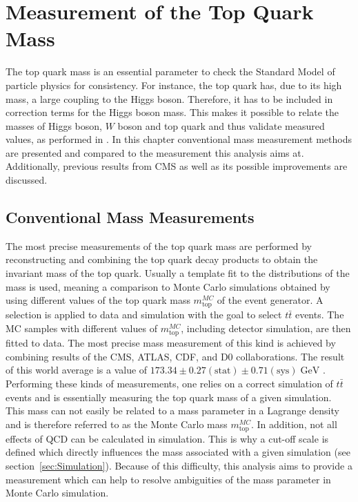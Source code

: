 \chapter{Measurement of the Top Quark Mass}
\label{ch:Measure}
	The top quark mass is an essential parameter to check the Standard Model of particle physics for consistency. For instance, the top quark has, due to its high mass, a large coupling to the Higgs boson. Therefore, it has to be included in correction terms for the Higgs boson mass. This makes it possible to relate the masses of Higgs boson, $W$ boson and top quark and thus validate measured values, as performed in \cite{ewfit}. In this chapter conventional mass measurement methods are presented and compared to the measurement this analysis aims at. Additionally, previous results from CMS as well as its possible improvements are discussed. 
	
\section{Conventional Mass Measurements}
	The most precise measurements of the top quark mass are performed by reconstructing and combining the top quark decay products to obtain the invariant mass of the top quark. Usually a template  fit to the distributions of the mass is used, meaning a comparison to Monte Carlo simulations obtained by using different values of the top quark mass $m_\text{top}^{MC}$ of the event generator. A selection is applied to data and simulation with the goal to select $t\bar{t}$ events. The MC samples with different values of $m_\text{top}^{MC}$, including detector simulation, are then fitted to data. The most precise mass measurement of this kind is achieved by combining results of the CMS, ATLAS, CDF, and D0 collaborations. The result of this world average is a value of $173.34 \pm 0.27 (\text{stat}) \pm 0.71 (\text{sys})\;\text{GeV}$ \cite{topmass_combination}. Performing these kinds of measurements, one relies on a correct simulation of $t\bar{t}$ events and is essentially measuring the top quark mass of a given simulation. This mass can not easily be related to a mass parameter in a Lagrange density and is therefore referred to as the Monte Carlo mass $m_\text{top}^{MC}$. In addition, not all effects of QCD can be calculated \cite{nonperturbative} in simulation. This is why a cut-off scale \cite{cutoff} is defined which directly influences the mass associated with a given simulation (see section~\ref{sec:Simulation}). Because of this difficulty, this analysis aims to provide a measurement which can help to resolve ambiguities of the mass parameter in Monte Carlo simulation.

